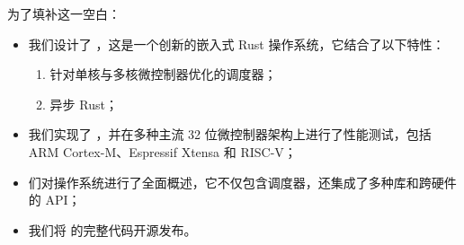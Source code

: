 为了填补这一空白：
\begin{itemize}
    \item 我们设计了 \OSname{}，这是一个创新的嵌入式 Rust 操作系统，它结合了以下特性：
    \begin{enumerate}[label=(\roman*)]
        \item 针对单核与多核微控制器优化的调度器；
        \item 异步 Rust；
    \end{enumerate}%
    \item 我们实现了 \OSname{}，并在多种主流 32 位微控制器架构上进行了性能测试，包括 ARM \mbox{Cortex\nobreakdash-M}、Espressif Xtensa 和 RISC-V；
    \item 们对操作系统进行了全面概述，它不仅包含调度器，还集成了多种库和跨硬件的 API；
    \item 我们将 \OSname{} 的完整代码开源发布。%
    
\end{itemize}